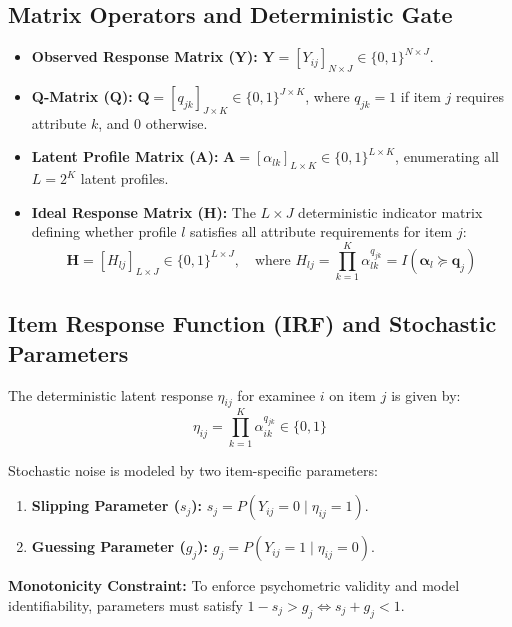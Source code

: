 \documentclass[11pt,a4paper]{article}
\begin{document}
\subsection{Matrix Operators and Deterministic Gate}

\begin{itemize}
    \item \textbf{Observed Response Matrix ($\mathbf{Y}$):} $\mathbf{Y} = [Y_{ij}]_{N \times J} \in \{0, 1\}^{N \times J}$.
    \item \textbf{Q-Matrix ($\mathbf{Q}$):} $\mathbf{Q} = [q_{jk}]_{J \times K} \in \{0, 1\}^{J \times K}$, where $q_{jk} = 1$ if item $j$ requires attribute $k$, and $0$ otherwise.
    \item \textbf{Latent Profile Matrix ($\mathbf{A}$):} $\mathbf{A} = [\alpha_{lk}]_{L \times K} \in \{0, 1\}^{L \times K}$, enumerating all $L = 2^K$ latent profiles.
    \item \textbf{Ideal Response Matrix ($\mathbf{H}$):} The $L \times J$ deterministic indicator matrix defining whether profile $l$ satisfies all attribute requirements for item $j$:
    \begin{equation}
        \mathbf{H} = [H_{lj}]_{L \times J} \in \{0, 1\}^{L \times J}, \quad \text{where } H_{lj} = \prod_{k=1}^K \alpha_{lk}^{q_{jk}} = I\left( \boldsymbol{\alpha}_l \succeq \mathbf{q}_j \right)
    \end{equation}
\end{itemize}

\subsection{Item Response Function (IRF) and Stochastic Parameters}

The deterministic latent response $\eta_{ij}$ for examinee $i$ on item $j$ is given by:
\begin{equation}
    \eta_{ij} = \prod_{k=1}^K \alpha_{ik}^{q_{jk}} \in \{0, 1\}
\end{equation}

Stochastic noise is modeled by two item-specific parameters:
\begin{enumerate}
    \item \textbf{Slipping Parameter ($s_j$):} $s_j = P(Y_{ij} = 0 \mid \eta_{ij} = 1)$.
    \item \textbf{Guessing Parameter ($g_j$):} $g_j = P(Y_{ij} = 1 \mid \eta_{ij} = 0)$.
\end{enumerate}

\textbf{Monotonicity Constraint:} To enforce psychometric validity and model identifiability, parameters must satisfy $1 - s_j > g_j \iff s_j + g_j < 1$.
\end{document}
